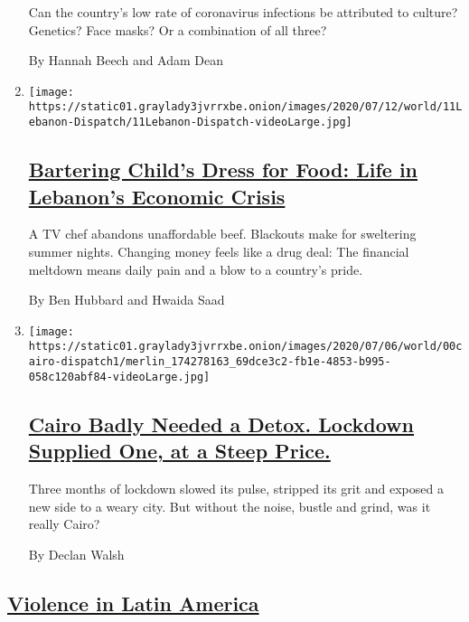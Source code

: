 \begin{enumerate}
  Can the country's low rate of coronavirus infections be attributed to
  culture? Genetics? Face masks? Or a combination of all three?

  By Hannah Beech and Adam Dean
\item
  \texttt{[image: https://static01.graylady3jvrrxbe.onion/images/2020/07/12/world/11Lebanon-Dispatch/11Lebanon-Dispatch-videoLarge.jpg]}

  \hypertarget{bartering-childs-dress-for-food-life-in-lebanons-economic-crisis}{%
  \subsection{\texorpdfstring{\href{/2020/07/12/world/middleeast/beirut-lebanon-economic-crisis.html}{Bartering
  Child's Dress for Food: Life in Lebanon's Economic
  Crisis}}{Bartering Child's Dress for Food: Life in Lebanon's Economic Crisis}}\label{bartering-childs-dress-for-food-life-in-lebanons-economic-crisis}}

  A TV chef abandons unaffordable beef. Blackouts make for sweltering
  summer nights. Changing money feels like a drug deal: The financial
  meltdown means daily pain and a blow to a country's pride.

  By Ben Hubbard and Hwaida Saad
\item
  \texttt{[image: https://static01.graylady3jvrrxbe.onion/images/2020/07/06/world/00cairo-dispatch1/merlin\_174278163\_69dce3c2-fb1e-4853-b995-058c120abf84-videoLarge.jpg]}

  \hypertarget{cairo-badly-needed-a-detox-lockdown-supplied-one-at-a-steep-price}{%
  \subsection{\texorpdfstring{\href{/2020/07/09/world/middleeast/cairo-lockdown-detox.html}{Cairo
  Badly Needed a Detox. Lockdown Supplied One, at a Steep
  Price.}}{Cairo Badly Needed a Detox. Lockdown Supplied One, at a Steep Price.}}\label{cairo-badly-needed-a-detox-lockdown-supplied-one-at-a-steep-price}}

  Three months of lockdown slowed its pulse, stripped its grit and
  exposed a new side to a weary city. But without the noise, bustle and
  grind, was it really Cairo?

  By Declan Walsh
\end{enumerate}

\hypertarget{violence-in-latin-america}{%
\subsection{\texorpdfstring{\href{/spotlight/violence-in-latin-america}{Violence
in Latin
America}}{Violence in Latin America}}\label{violence-in-latin-america}}

